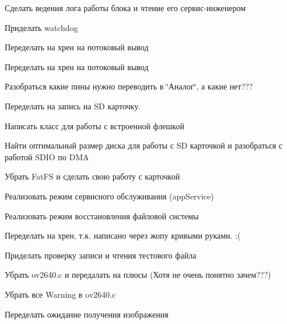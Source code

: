 
\begin{DoxyRefList}
\item[\label{todo__todo000005}%
\Hypertarget{todo__todo000005}%
Класс \hyperlink{classapp_1_1_t_application}{app\+:\+:T\+Application} ]Сделать ведения лога работы блока и чтение его сервис-\/инженером 

Приделать watchdog  
\item[\label{todo__todo000002}%
\Hypertarget{todo__todo000002}%
Член \hyperlink{classapp_1_1_t_application_a9f4f8b1ef208edca2c5ea5ef1851efca}{app\+:\+:T\+Application\+:\+:debug\+Message} (const uint8\+\_\+t $\ast$, const std\+::size\+\_\+t)]Переделать на хрен на потоковый вывод  
\item[\label{todo__todo000001}%
\Hypertarget{todo__todo000001}%
Член \hyperlink{classapp_1_1_t_application_abec229b87538c5db318ef57f25f6e84d}{app\+:\+:T\+Application\+:\+:debug\+Message} (const std\+::string \&)]Переделать на хрен на потоковый вывод  
\item[\label{todo__todo000003}%
\Hypertarget{todo__todo000003}%
Член \hyperlink{classapp_1_1_t_application_ab44dd5aa2afe1d66b2588e908bfad4d0}{app\+:\+:T\+Application\+:\+:sleep} ()]Разобраться какие пины нужно переводить в \char`\"{}Аналог\char`\"{}, а какие нет???  
\item[\label{todo__todo000009}%
\Hypertarget{todo__todo000009}%
Класс \hyperlink{classapp_1_1_t_log}{app\+:\+:T\+Log} ]Переделать на запись на SD карточку. 

Написать класс для работы с встроенной флешкой  
\item[\label{todo__todo000004}%
\Hypertarget{todo__todo000004}%
Член \hyperlink{group___xD0_x9F_xD0_xB5_xD1_x80_xD0_xB5_xD1_x87_xD0_xB8_xD1_x81_xD0_xBB_xD0_xB5_xD0_xBD_xD0_xB8_xD1_x8F_ga33d8f1a04a907b6c65c5dfc88280ac6f}{app\+:\+:type\+Sound} ]Найти оптимальный размер диска для работы с SD карточкой и разобраться с работой S\+D\+IO по D\+MA 

Убрать Fat\+FS и сделать свою работу с карточкой 

Реализовать режим сервисного обслуживания (app\+Service) 

Реализовать режим восстановления файловой системы  
\item[\label{todo__todo000006}%
\Hypertarget{todo__todo000006}%
Член \hyperlink{classunit_1_1_t_audio_ad547ef4d28534b9cd76d2e7eb539d1e0}{unit\+:\+:T\+Audio\+:\+:process} ()]Переделать на хрен, т.\+к. написано через жопу кривыми руками. \+:(  
\item[\label{todo__todo000008}%
\Hypertarget{todo__todo000008}%
Член \hyperlink{classunit_1_1_t_file_system_a0737b50d219570ae2e11ea17a32cc85c}{unit\+:\+:T\+File\+System\+:\+:check} ()]Приделать проверку записи и чтения тестового файла  
\item[\label{todo__todo000011}%
\Hypertarget{todo__todo000011}%
Класс \hyperlink{classunit_1_1_t_photo}{unit\+:\+:T\+Photo} ]Убрать ov2640.\+c и передалать на плюсы (Хотя не очень понятно зачем???) 

Убрать все Warning в ov2640.\+c  
\item[\label{todo__todo000010}%
\Hypertarget{todo__todo000010}%
Член \hyperlink{classunit_1_1_t_photo_a8323fa27bff29d883e9903b74c341605}{unit\+:\+:T\+Photo\+:\+:process} ()]Переделать ожидание получения изображения 
\end{DoxyRefList}